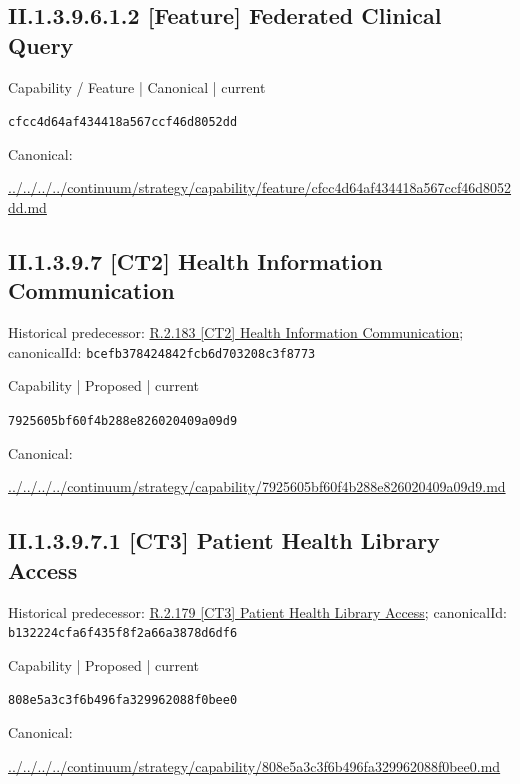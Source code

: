 \documentclass[10pt,a4paper]{article}
\begin{document}
\subsection*{II.1.3.9.6.1.2 [Feature] Federated Clinical Query}
\label{element-cfcc4d64af434418a567ccf46d8052dd}
{\small Capability / Feature | Canonical | current}\par
\texttt{cfcc4d64af434418a567ccf46d8052dd}\par
Canonical: \par
{\footnotesize\url{../../../../continuum/strategy/capability/feature/cfcc4d64af434418a567ccf46d8052dd.md}}\par
\subsection*{II.1.3.9.7 [CT2] Health Information Communication}
Historical predecessor: \hyperref[element-bcefb378424842fcb6d703208c3f8773]{R.2.183 [CT2] Health Information Communication}; canonicalId: \texttt{bcefb378424842fcb6d703208c3f8773}\par
\label{element-7925605bf60f4b288e826020409a09d9}
{\small Capability | Proposed | current}\par
\texttt{7925605bf60f4b288e826020409a09d9}\par
Canonical: \par
{\footnotesize\url{../../../../continuum/strategy/capability/7925605bf60f4b288e826020409a09d9.md}}\par
\subsection*{II.1.3.9.7.1 [CT3] Patient Health Library Access}
Historical predecessor: \hyperref[element-b132224cfa6f435f8f2a66a3878d6df6]{R.2.179 [CT3] Patient Health Library Access}; canonicalId: \texttt{b132224cfa6f435f8f2a66a3878d6df6}\par
\label{element-808e5a3c3f6b496fa329962088f0bee0}
{\small Capability | Proposed | current}\par
\texttt{808e5a3c3f6b496fa329962088f0bee0}\par
Canonical: \par
{\footnotesize\url{../../../../continuum/strategy/capability/808e5a3c3f6b496fa329962088f0bee0.md}}\par
\end{document}
